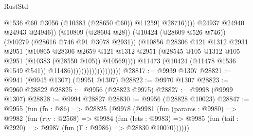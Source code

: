 \begin{lexlean}{RustStd}
\begin{coremodule}
                                                          @1536
                                                          @60
                                                          @3056
                                                          (@10383 (@28650 @60))
                                                          @11259)
                                                        @28716))))
                                                @24937
                                                @24940
                                                @24943
                                                @24946))
                                            (@10809 (@28604 @28))
                                            (@10424 (@28609 @526 @746))
                                            (@10279 (@28616 @746 @91 @3078 @2931))
                                            (@10856
                                              @28306
                                              @121
                                              @1312
                                              @2931
                                              @2951
                                              (@10865
                                                @28306
                                                @2659
                                                @121
                                                @1312
                                                @2951
                                                (@28545
                                                  @105
                                                  @1312
                                                  @105
                                                  @2951
                                                  (@10383 (@28550 @105))
                                                  @10569))))
                                          @11473
                                          (@10424 (@11478 @1536 @1549 @541))
                                          @11486)))))))))))))))))))
@28817 := @9939 @1307
@28821 := @9941 (@9945 @1307) (@9951 @1307)
@28822 := @9970 @1307
@28823 := @9960 @28822
@28825 := @9956 (@28823 @9975)
@28827 := @9998 (@9999 @1307)
@28828 := @9994 @28827
@28830 := @9956 (@28828 @10023)
@28847 := @9955
    (fun (fn : @86) =>
    @28825
      (@9978
        (@9981
          (fun (params : @9980) =>
          @9982
            (fun (rty : @2568) =>
            @9984
              (fun (lets : @9983) =>
              @9985 (fun (tail : @2920) => @9987 (fun (Γ : @9986) => @28830 @10070))))))

\end{coremodule}
\end{lexlean}
